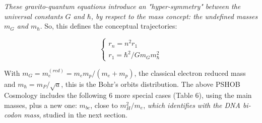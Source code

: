 \documentclass[a4paper,9pt]{article}
\newcounter{row}
\begin{document}
\textit{These gravito-quantum equations introduce an "hyper-symmetry" between the universal constants $G$ and $\hbar$, by respect to the mass concept: the undefined masses $m_G$ and $m_{\hbar}$}. So, this defines the conceptual trajectories:

\begin{equation}
 \left\{
    \begin{array}{ll}
        r_n = n^2 r_1 \\
        
        r_1 = \hbar^2/Gm_Gm_{\hbar}^2   
    \end{array}
\right.
\end{equation}

With $m_G = m_e^{(red)} = m_em_p/(m_e+m_p)$, the classical electron reduced mass and $m_{\hbar} = m_P/\sqrt a$, this is the Bohr's orbits distribution. The above PSHOB Cosmology includes the following 6 more special cases (Table 6), using the main masses, plus a new one: $m_{bc}$, close to $m_H^2/m_e$, \textit{which identifies with the DNA bi-codon mass}, studied in the next section.

    
    
        
        
        
         

\end{document}
